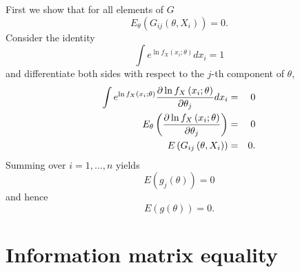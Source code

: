 \documentclass{article}
\begin{document}
First we show that for all elements of $G$%
\begin{equation*}
E_{\theta }\left( G_{ij}\left( \theta ,X_{i}\right) \right) =0.
\end{equation*}%
Consider the identity%
\begin{equation*}
\int e^{\ln f_{X}\left( x_{i};\theta \right) }dx_{i}=1
\end{equation*}%
and differentiate both sides with respect to the $j$-th component of $\theta
$,%
\begin{eqnarray*}
\int e^{\ln f_{X}\left( x_{i};\theta \right) }\frac{\partial \ln f_{X}\left(
x_{i};\theta \right) }{\partial \theta _{j}}dx_{i} &=&0 \\
E_{\theta }\left( \frac{\partial \ln f_{X}\left( x_{i};\theta \right) }{%
\partial \theta _{j}}\right) &=&0 \\
E\left( G_{ij}\left( \theta ,X_{i}\right) \right) &=&0.
\end{eqnarray*}%
Summing over $i=1,\ldots ,n$ yields%
\begin{equation*}
E\left( g_{j}\left( \theta \right) \right) =0
\end{equation*}%
and hence%
\begin{equation*}
E\left( g\left( \theta \right) \right) =0.
\end{equation*}

\section{Information matrix equality}
\end{document}
